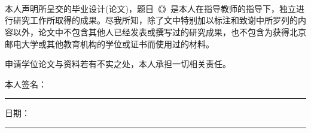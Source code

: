
\begin{titlepage}
    \wuhao\quad{} \\
    \begin{spacing}{1.6}
        \centering
         \\
          \\
    \end{spacing}
    
    \normalsize
    
    \quad{}

    本人声明所呈交的毕业设计(论文)，题目《\thesistitle》是本人在指导教师的指导下，独立进行研究工作所取得的成果。尽我所知，除了文中特别加以标注和致谢中所罗列的内容以外，论文中不包含其他人已经发表或撰写过的研究成果，也不包含为获得北京邮电大学或其他教育机构的学位或证书而使用过的材料。

    申请学位论文与资料若有不实之处，本人承担一切相关责任。

    \quad{} 

    本人签名：\rule[-2pt]{4cm}{1pt}\quad 日期：\rule[-2pt]{4cm}{1pt}
\end{titlepage}


